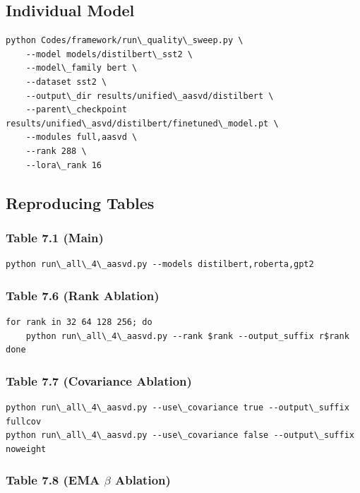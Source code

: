 \subsection{Individual Model}

\begin{lstlisting}
python Codes/framework/run\_quality\_sweep.py \
    --model models/distilbert\_sst2 \
    --model\_family bert \
    --dataset sst2 \
    --output\_dir results/unified\_aasvd/distilbert \
    --parent\_checkpoint results/unified\_asvd/distilbert/finetuned\_model.pt \
    --modules full,aasvd \
    --rank 288 \
    --lora\_rank 16
\end{lstlisting}

\subsection{Reproducing Tables}

\subsubsection{Table 7.1 (Main)}

\begin{lstlisting}
python run\_all\_4\_aasvd.py --models distilbert,roberta,gpt2
\end{lstlisting}

\subsubsection{Table 7.6 (Rank Ablation)}

\begin{lstlisting}
for rank in 32 64 128 256; do
    python run\_all\_4\_aasvd.py --rank $rank --output_suffix r$rank
done
\end{lstlisting}

\subsubsection{Table 7.7 (Covariance Ablation)}

\begin{lstlisting}
python run\_all\_4\_aasvd.py --use\_covariance true --output\_suffix fullcov
python run\_all\_4\_aasvd.py --use\_covariance false --output\_suffix noweight
\end{lstlisting}

\subsubsection{Table 7.8 (EMA $\beta$ Ablation)}

